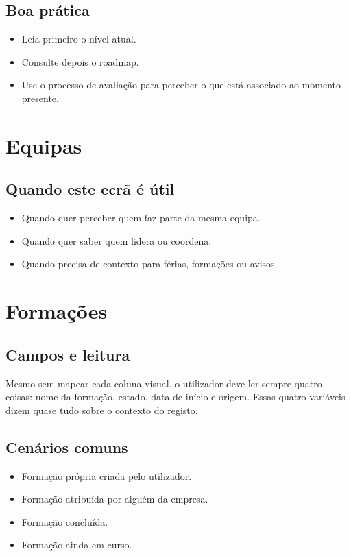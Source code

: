 \subsection{Boa prática}
\begin{itemize}
  \item Leia primeiro o nível atual.
  \item Consulte depois o roadmap.
  \item Use o processo de avaliação para perceber o que está associado ao momento presente.
\end{itemize}

\section{Equipas}
\subsection{Quando este ecrã é útil}
\begin{itemize}
  \item Quando quer perceber quem faz parte da mesma equipa.
  \item Quando quer saber quem lidera ou coordena.
  \item Quando precisa de contexto para férias, formações ou avisos.
\end{itemize}

\section{Formações}
\subsection{Campos e leitura}
Mesmo sem mapear cada coluna visual, o utilizador deve ler sempre quatro coisas: nome da formação, estado, data de início e origem. Essas quatro variáveis dizem quase tudo sobre o contexto do registo.

\subsection{Cenários comuns}
\begin{itemize}
  \item Formação própria criada pelo utilizador.
  \item Formação atribuída por alguém da empresa.
  \item Formação concluída.
  \item Formação ainda em curso.
\end{itemize}

